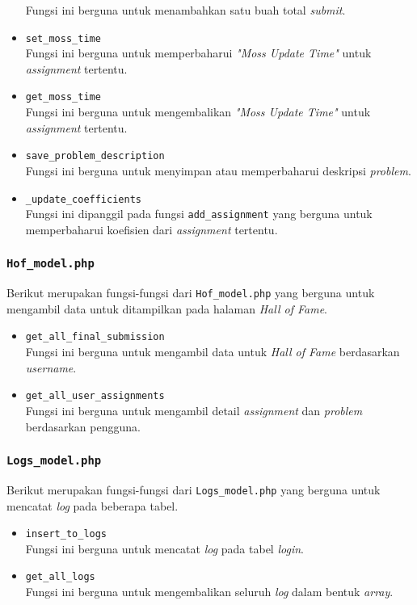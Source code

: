 \begin{itemize}
	Fungsi ini berguna untuk menambahkan satu buah total \textit{submit}.
	\item \texttt{set\_moss\_time}\\
	Fungsi ini berguna untuk memperbaharui \textit{"Moss Update Time"} untuk \textit{assignment} tertentu.
	\item \texttt{get\_moss\_time}\\
	Fungsi ini berguna untuk mengembalikan \textit{"Moss Update Time"} untuk \textit{assignment} tertentu.
	\item \texttt{save\_problem\_description}\\
	Fungsi ini berguna untuk menyimpan atau memperbaharui deskripsi \textit{problem}.
	\item \texttt{\_update\_coefficients}\\
	Fungsi ini dipanggil pada fungsi \texttt{add\_assignment} yang berguna untuk memperbaharui koefisien dari \textit{assignment} tertentu.
\end{itemize}
\subsubsection{\texttt{Hof\_model.php}}
Berikut merupakan fungsi-fungsi dari \texttt{Hof\_model.php} yang berguna untuk mengambil data untuk ditampilkan pada halaman \textit{Hall of Fame}.
\begin{itemize}
	\item \texttt{get\_all\_final\_submission}\\
	Fungsi ini berguna untuk mengambil data untuk \textit{Hall of Fame} berdasarkan \textit{username}.
	\item \texttt{get\_all\_user\_assignments}\\
	Fungsi ini berguna untuk mengambil detail \textit{assignment} dan \textit{problem} berdasarkan pengguna.
\end{itemize}
\subsubsection{\texttt{Logs\_model.php}}
Berikut merupakan fungsi-fungsi dari \texttt{Logs\_model.php} yang berguna untuk mencatat \textit{log} pada beberapa tabel.
\begin{itemize}
	\item \texttt{insert\_to\_logs}\\
	Fungsi ini berguna untuk mencatat \textit{log} pada tabel \textit{login}.
	\item \texttt{get\_all\_logs}\\
	Fungsi ini berguna untuk mengembalikan seluruh \textit{log} dalam bentuk \textit{array}.
\end{itemize}
